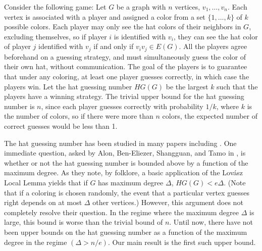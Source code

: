 \documentclass{amsart}
\newcommand{\1}{\mathds{1}}
\numberwithin{theorem}{section}
\def\cC{\ensuremath{\mathcal{C}}}
\begin{document}
Consider the following game: Let $G$ be a graph with $n$ vertices, $v_1,\ldots,v_n$. Each vertex is associated with a player and assigned a color from a set $\{1,\ldots, k\}$ of $k$ possible colors.
Each player may only see the hat colors of their neighbors in $G$, excluding themselves, so if player $i$ is identified with $v_i$, they can see the hat color of player $j$ identified with $v_j$ if and only if $v_iv_j\in E(G)$. All the players agree beforehand on a guessing strategy, and must simultaneously guess the color of their own hat, without communication. The goal of the players is to guarantee that under any coloring, at least one player guesses correctly, in which case the players win. Let the hat guessing number $HG(G)$ be the largest $k$ such that the players have a winning strategy. 
The trivial upper bound for the hat guessing number is $n$, since each player guesses correctly with probability $1/k$, where $k$ is the number of colors, so %
if there were more than $n$ colors, the expected number of correct guesses would be less than 1.   


The hat guessing number has been studied in many papers including \cite{alon2020hat,bosek2021hat,HeIdoPrzybocki2022,kokhas2019graphs,latyshev2024hat,butler2009hat,latyshev2022hats}.
One immediate question, asked by Alon, Ben-Eliezer, Shangguan, and Tamo in \cite{alon2020hat}, is whether or not the hat guessing number is bounded above by a function of the maximum degree. %
As they note, by folklore, 
a basic application of the Lovász Local Lemma yields that if $G$ has maximum degree $\Delta$, $HG(G) < e\Delta$. (Note that if a coloring is chosen randomly, the event that a particular vertex guesses right depends on at most $\Delta$ other vertices.) %
However, this argument does not completely resolve their question. In the regime where the maximum degree $\Delta$ is large, this bound is worse than the trivial bound of $n$. Until now, there have not been upper bounds on the hat guessing number as a function of the maximum degree in the regime $(\Delta>n/e)$. Our main result is the first such upper bound.
\end{document}
